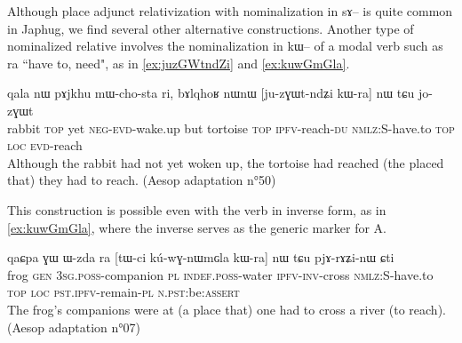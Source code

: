 \documentclass[oldfontcommands,oneside,a4paper,11pt]{article}
\newcommand{\ipa}[1]{{\phon #1}} %
\begin{document}
Although place adjunct relativization with nominalization in \ipa{sɤ}-- is quite common in Japhug, we find several other alternative constructions. Another type of nominalized relative involves the nominalization in \ipa{kɯ}-- of a modal verb such as \ipa{ra} ``have to, need", as in  \ref{ex:juzGWtndZi} and \ref{ex:kuwGmGla}.

\begin{exe}
   \ex \label{ex:juzGWtndZi}
 \gll
\ipa{qala}   	\ipa{nɯ}   	\ipa{pɤjkhu}   	\ipa{mɯ-cho-sta}   	\ipa{ri,}   	\ipa{bɤlqhoʁ}   	\ipa{nɯnɯ}   	[\ipa{ju-zɣɯt-ndʑi}   	\ipa{kɯ-ra}]   	\ipa{nɯ} \ipa{tɕu}   	\ipa{jo-zɣɯt}   \\
rabbit \textsc{top} yet \textsc{neg-evd}-wake.up but tortoise \textsc{top} \textsc{ipfv}-reach-\textsc{du} \textsc{nmlz:S}-have.to \textsc{top} \textsc{loc} \textsc{evd}-reach \\
\glt Although the rabbit had not yet woken up, the tortoise had reached (the placed that) they had to reach.
(Aesop adaptation n°50)
\end{exe}

This construction is possible even with the verb in inverse form, as in \ref{ex:kuwGmGla}, where the inverse serves as the generic marker for A.
\begin{exe}
   \ex \label{ex:kuwGmGla}
 \gll
\ipa{qaɕpa}   	\ipa{ɣɯ}   	\ipa{ɯ-zda}   	\ipa{ra}   	[\ipa{tɯ-ci}   	\ipa{kú-wɣ-nɯmɢla}   	\ipa{kɯ-ra}]   	\ipa{nɯ} \ipa{tɕu}   	\ipa{pjɤ-rɤʑi-nɯ}   	\ipa{ɕti}   \\
frog \textsc{gen}  \textsc{3sg.poss}-companion \textsc{pl} \textsc{indef.poss}-water \textsc{ipfv-inv}-cross \textsc{nmlz:S}-have.to \textsc{top} \textsc{loc} \textsc{pst.ipfv}-remain-\textsc{pl} \textsc{n.pst}:be:\textsc{assert} \\
\glt The frog's companions were at (a place that) one had to cross a river (to reach). (Aesop adaptation n°07)
\end{exe}

\end{document}
